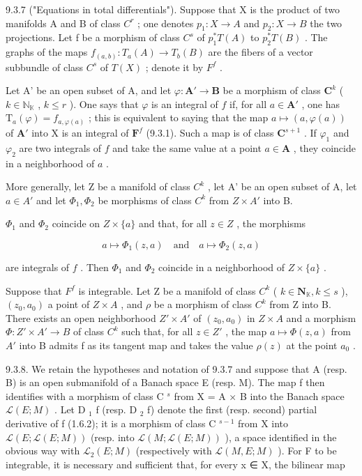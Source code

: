 9.3.7 ("Equations in total differentials"). Suppose that X is the product of two manifolds A and B of class \(C^{r}\) ; one denotes \(p_{1}: X \to A\) and \(p_{2}: X \to B\) the two projections. Let f be a morphism of class \(C^{s}\) of \(p_{1}^{*}T(A)\) to \(p_{2}^{*}T(B)\) . The graphs of the maps \(f_{(a,b)}: T_{a}(A) \to T_{b}(B)\) are the fibers of a vector subbundle of class \(C^{s}\) of \(T(X)\) ; denote it by \(F^{f}\) .

Let A' be an open subset of A, and let \(\varphi: \mathbf{A}' \to \mathbf{B}\) be a morphism of class \(\mathbf{C}^k\) ( \(k \in \mathbb{N}_{\mathbb{K}}\) , \(k \leqslant r\) ). One says that \(\varphi\) is an integral of \(f\) if, for all \(a \in \mathbf{A}'\) , one has \(\mathrm{T}_a(\varphi) = f_{a,\varphi(a)}\) ; this is equivalent to saying that the map \(a \mapsto (a, \varphi(a))\) of \(\mathbf{A}'\) into X is an integral of \(\mathbf{F}^f\) (9.3.1). Such a map is of class \(\mathbf{C}^{s+1}\) . If \(\varphi_1\) and \(\varphi_2\) are two integrals of \(f\) and take the same value at a point \(a \in \mathbf{A}\) , they coincide in a neighborhood of \(a\) .

More generally, let Z be a manifold of class \(C^{k}\) , let A' be an open subset of A, let \(a \in A'\) and let \(\Phi_{1}, \Phi_{2}\) be morphisms of class \(C^{k}\) from \(Z \times A'\) into B.

\(\Phi_{1}\) and \(\Phi_{2}\) coincide on \(Z \times \{a\}\) and that, for all \(z \in Z\) , the morphisms

\[
a \mapsto \Phi_ {1} (z, a) \quad \text {and} \quad a \mapsto \Phi_ {2} (z, a)
\]

are integrals of \(f\) . Then \(\Phi_{1}\) and \(\Phi_{2}\) coincide in a neighborhood of \(Z \times \{a\}\) .

Suppose that \(F^{f}\) is integrable. Let Z be a manifold of class \(C^{k}\) ( \(k \in \mathbf{N}_{\mathbb{K}}, k \leqslant s\) ), \((z_{0}, a_{0})\) a point of \(Z \times A\) , and \(\rho\) be a morphism of class \(C^{k}\) from Z into B. There exists an open neighborhood \(Z' \times A'\) of \((z_{0}, a_{0})\) in \(Z \times A\) and a morphism \(\Phi: Z' \times A' \to B\) of class \(C^{k}\) such that, for all \(z \in Z'\) , the map \(a \mapsto \Phi(z, a)\) from \(A'\) into B admits f as its tangent map and takes the value \(\rho(z)\) at the point \(a_{0}\) .

9.3.8. We retain the hypotheses and notation of 9.3.7 and suppose that A (resp. B) is an open submanifold of a Banach space E (resp. M). The map f then identifies with a morphism of class C \(^{s}\) from X = A × B into the Banach space \(\mathcal{L}(E; M)\) . Let D \(_{1}\) f (resp. D \(_{2}\) f) denote the first (resp. second) partial derivative of f (1.6.2); it is a morphism of class C \(^{s-1}\) from X into \(\mathcal{L}(E; \mathcal{L}(E; M))\) (resp. into \(\mathcal{L}(M; \mathcal{L}(E; M))\) ), a space identified in the obvious way with \(\mathcal{L}_{2}(E; M)\) (respectively with \(\mathcal{L}(M, E; M)\) ). For F to be integrable, it is necessary and sufficient that, for every x ∈ X, the bilinear map

